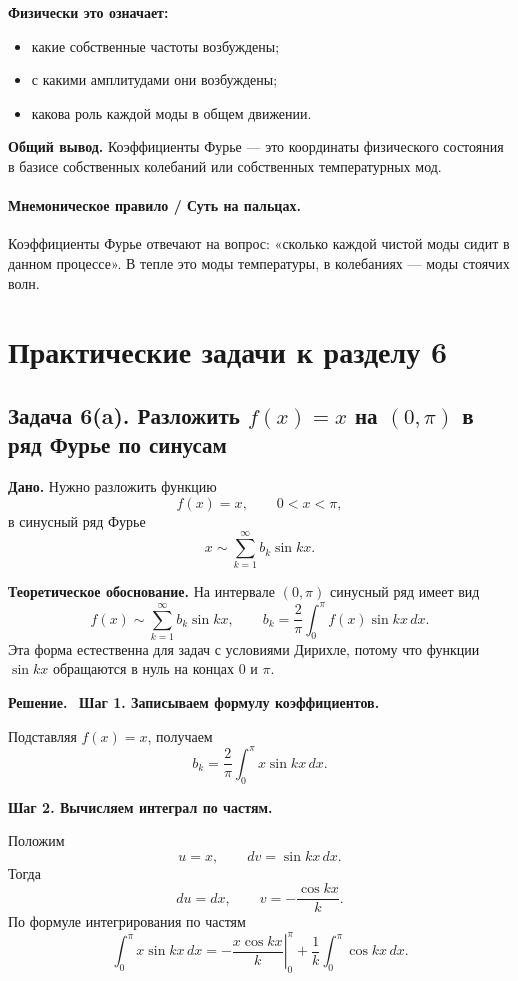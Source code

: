\documentclass[a4paper,12pt]{article}
\newcommand{\Solution}{\textbf{Решение.}\ }
\begin{document}
\textbf{Физически это означает:}
\begin{itemize}
  \item какие собственные частоты возбуждены;
  \item с какими амплитудами они возбуждены;
  \item какова роль каждой моды в общем движении.
\end{itemize}

\textbf{Общий вывод.}
Коэффициенты Фурье --- это координаты физического состояния в базисе собственных колебаний или собственных температурных мод.

\paragraph{Мнемоническое правило / Суть на пальцах.}
Коэффициенты Фурье отвечают на вопрос: «сколько каждой чистой моды сидит в данном процессе». В тепле это моды температуры, в колебаниях --- моды стоячих волн.

\section*{Практические задачи к разделу 6}

\subsection*{Задача 6(a). Разложить \texorpdfstring{$f(x)=x$}{f(x)=x} на \texorpdfstring{$(0,\pi)$}{(0,pi)} в ряд Фурье по синусам}

\textbf{Дано.}
Нужно разложить функцию
\[
f(x)=x,
\qquad
0<x<\pi,
\]
в синусный ряд Фурье
\[
x\sim \sum_{k=1}^{\infty} b_k \sin kx.
\]

\textbf{Теоретическое обоснование.}
На интервале $(0,\pi)$ синусный ряд имеет вид
\[
f(x)\sim \sum_{k=1}^{\infty}b_k\sin kx,
\qquad
b_k=\frac{2}{\pi}\int_0^{\pi}f(x)\sin kx\,dx.
\]
Эта форма естественна для задач с условиями Дирихле, потому что функции $\sin kx$ обращаются в нуль на концах $0$ и $\pi$.

\Solution
\textbf{Шаг 1. Записываем формулу коэффициентов.}

Подставляя $f(x)=x$, получаем
\[
b_k=\frac{2}{\pi}\int_0^{\pi}x\sin kx\,dx.
\]

\textbf{Шаг 2. Вычисляем интеграл по частям.}

Положим
\[
u=x,
\qquad
dv=\sin kx\,dx.
\]
Тогда
\[
du=dx,
\qquad
v=-\frac{\cos kx}{k}.
\]
По формуле интегрирования по частям
\[
\int_0^{\pi}x\sin kx\,dx
=
\left.-\frac{x\cos kx}{k}\right|_0^{\pi}
+\frac{1}{k}\int_0^{\pi}\cos kx\,dx.
\]
\end{document}
